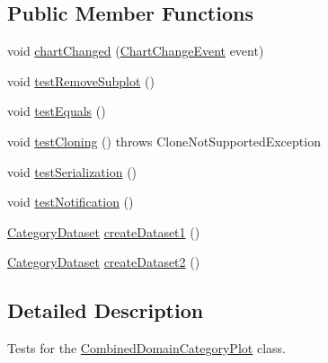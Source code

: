\subsection*{Public Member Functions}
\begin{DoxyCompactItemize}
\item 
void \mbox{\hyperlink{classorg_1_1jfree_1_1chart_1_1plot_1_1_combined_domain_category_plot_test_a70a89952544593432dd1e2f02a9b7973}{chart\+Changed}} (\mbox{\hyperlink{classorg_1_1jfree_1_1chart_1_1event_1_1_chart_change_event}{Chart\+Change\+Event}} event)
\item 
void \mbox{\hyperlink{classorg_1_1jfree_1_1chart_1_1plot_1_1_combined_domain_category_plot_test_a1f3add7349c8fd0dda9eb69f0281e6bf}{test\+Remove\+Subplot}} ()
\item 
void \mbox{\hyperlink{classorg_1_1jfree_1_1chart_1_1plot_1_1_combined_domain_category_plot_test_a9c51ed840b29dfdec527dbc268021fef}{test\+Equals}} ()
\item 
void \mbox{\hyperlink{classorg_1_1jfree_1_1chart_1_1plot_1_1_combined_domain_category_plot_test_ad698a82b1a9a74b0095f74d74051c4b5}{test\+Cloning}} ()  throws Clone\+Not\+Supported\+Exception 
\item 
void \mbox{\hyperlink{classorg_1_1jfree_1_1chart_1_1plot_1_1_combined_domain_category_plot_test_a273b03f82a07f13e3e7a1ec421b5c201}{test\+Serialization}} ()
\item 
void \mbox{\hyperlink{classorg_1_1jfree_1_1chart_1_1plot_1_1_combined_domain_category_plot_test_a7e9b38bab75061dcba1edd3fb61ff934}{test\+Notification}} ()
\item 
\mbox{\hyperlink{interfaceorg_1_1jfree_1_1data_1_1category_1_1_category_dataset}{Category\+Dataset}} \mbox{\hyperlink{classorg_1_1jfree_1_1chart_1_1plot_1_1_combined_domain_category_plot_test_a45d0b5e25a8a2e92760ad3a6932d7cef}{create\+Dataset1}} ()
\item 
\mbox{\hyperlink{interfaceorg_1_1jfree_1_1data_1_1category_1_1_category_dataset}{Category\+Dataset}} \mbox{\hyperlink{classorg_1_1jfree_1_1chart_1_1plot_1_1_combined_domain_category_plot_test_ad03fb402cb820df30a8b8b2bcdb67e95}{create\+Dataset2}} ()
\end{DoxyCompactItemize}


\subsection{Detailed Description}
Tests for the \mbox{\hyperlink{classorg_1_1jfree_1_1chart_1_1plot_1_1_combined_domain_category_plot}{Combined\+Domain\+Category\+Plot}} class. 


